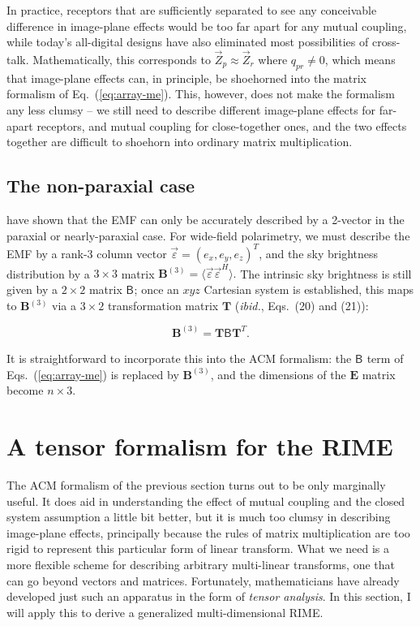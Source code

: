 \documentclass{aa}
\newcommand{\herm}{H}
\newcommand{\jones}[2]{\vec {#1}_{#2}}
\newcommand{\coh}[2]{\mathsf{{#1}}_{{#2}}}
\begin{document}
In practice, receptors that are sufficiently separated to see any conceivable difference in image-plane effects would be too 
far apart for any mutual coupling, while today's all-digital designs have also eliminated most possibilities of 
cross-talk. Mathematically, this corresponds to $\jones{Z}{p} \approx \jones{Z}{r}$ where $q_{pr} \ne 0$, which means that image-plane 
effects can, in principle, be shoehorned into the matrix formalism of Eq.~(\ref{eq:array-me}). This, however, 
does not make the formalism any less clumsy -- we still need to describe different image-plane effects for far-apart receptors, and mutual coupling for close-together ones, and the two effects together are difficult to shoehorn into ordinary matrix multiplication. 

\subsection{The non-paraxial case}
\label{sec:matrix-3d}

\citet{Carozzi:ME3D} have shown that the EMF can only be accurately described by a 2-vector in the paraxial or nearly-paraxial case. For wide-field polarimetry, we must describe the EMF by a rank-3 column vector $\vec\varepsilon=(e_x,e_y,e_z)^T$, and the sky brightness distribution by a $3\times3$ matrix $\mathbf{B}^{(3)}=\langle \vec\varepsilon \vec\varepsilon^\herm \rangle.$ The intrinsic sky brightness is still given by a $2\times2$ matrix $\coh{B}{}$; once an $xyz$ Cartesian system is established, this maps to $\mathbf{B}{}^{(3)}$ via a $3\times2$ transformation matrix $\mathbf{T}$ ({\em ibid.}, Eqs.~(20) and (21)):

\[
  \mathbf{B}^{(3)} = \mathbf{T} \coh{B}{} \mathbf{T}^T.
\]

It is straightforward to incorporate this into the ACM formalism: the $\coh{B}{}$ term of Eqs.~(\ref{eq:array-me}) 
is replaced by $\mathbf{B}^{(3)}$, and the dimensions of the $\mathbf{E}$ matrix become $n\times3$.

\section{A tensor formalism for the RIME}
\label{sec:tensor}

The ACM formalism of the previous section turns out to be only marginally useful. It does aid in understanding the effect of mutual coupling and the closed system assumption a little bit better, but it is much too clumsy in describing image-plane effects, principally because the rules of matrix multiplication are too rigid to represent this particular form of linear transform. What we need is a more flexible scheme for describing arbitrary multi-linear transforms, one that can go beyond vectors and matrices. Fortunately, mathematicians have already developed just such an apparatus in the form of \emph{tensor analysis}. In this section, I will apply this to derive a generalized multi-dimensional RIME.
\end{document}
